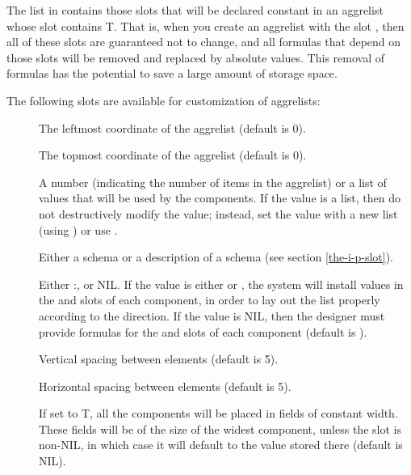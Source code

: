 The list in  contains those slots that will be
declared constant in an aggrelist whose  slot contains T.
That is, when you create an aggrelist with the slot {\obeyspaces {}},
then all of these slots are guaranteed not to change, and all formulas
that depend on those slots will be removed and replaced by absolute
values.  This removal of formulas has the potential to save a large amount
of storage space.

The following slots are available for customization of aggrelists:

\begin{description}
\item[]  \value{shortdash} The leftmost coordinate of the aggrelist
(default is 0).

\item[]  \value{shortdash} The topmost coordinate of the aggrelist
(default is 0).

\item[]  \value{shortdash} A number (indicating the number of items
in the aggrelist) or a list of values that will be used by the components.
If the value is a list, then do not destructively modify the value;
instead, set the value with a new list (using ) or use .

\item[]  \value{shortdash} Either a schema or a
description of a schema (see section \ref{the-i-p-slot}).

\item[]  \value{shortdash} Either :,
 or NIL.  If the value is either  or
, the system will install values in the  and
 slots of each component, in order to lay out the
list properly according to the direction.  If the value is NIL, then the
designer must provide formulas for the  and 
slots of each component (default is ).

\item[]  \value{shortdash} Vertical spacing between elements
(default is 5).

\item[]  \value{shortdash} Horizontal spacing between elements
(default is 5).

\item[]  \value{shortdash} If set to T, all the components
will be placed in fields of constant width.  These fields will be of
the size of the widest component, unless the slot
 is non-NIL, in which case it will default to
the value stored there (default is NIL).


\end{description}
